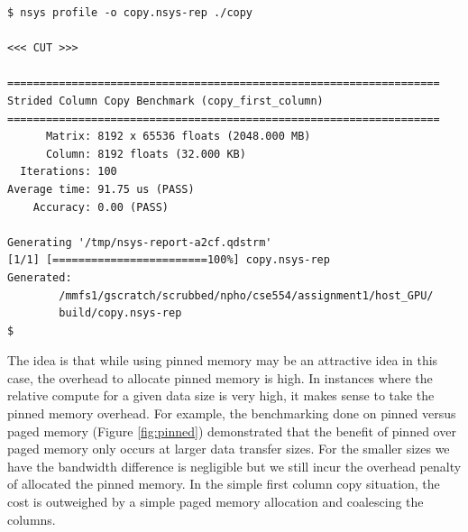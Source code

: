 \documentclass[12pt]{article}
\begin{document}
\begin{enumerate}[label=\textbf{Q\arabic*.}]
    \begin{verbatim}
$ nsys profile -o copy.nsys-rep ./copy

<<< CUT >>>

===================================================================
Strided Column Copy Benchmark (copy_first_column)
===================================================================
      Matrix: 8192 x 65536 floats (2048.000 MB)
      Column: 8192 floats (32.000 KB)
  Iterations: 100
Average time: 91.75 us (PASS)
    Accuracy: 0.00 (PASS)

Generating '/tmp/nsys-report-a2cf.qdstrm'
[1/1] [========================100%] copy.nsys-rep
Generated:
        /mmfs1/gscratch/scrubbed/npho/cse554/assignment1/host_GPU/
        build/copy.nsys-rep
$
    \end{verbatim}

    The idea is that while using pinned memory may be an attractive idea in this case, the overhead to allocate pinned memory is high. In instances where the relative compute for a given data size is very high, it makes sense to take the pinned memory overhead. For example, the benchmarking done on pinned versus paged memory (Figure \ref{fig:pinned}) demonstrated that the benefit of pinned over paged memory only occurs at larger data transfer sizes. For the smaller sizes we have the bandwidth difference is negligible but we still incur the overhead penalty of allocated the pinned memory. In the simple first column copy situation, the cost is outweighed by a simple paged memory allocation and coalescing the columns.
\end{enumerate}

\printbibliography
\end{document}
